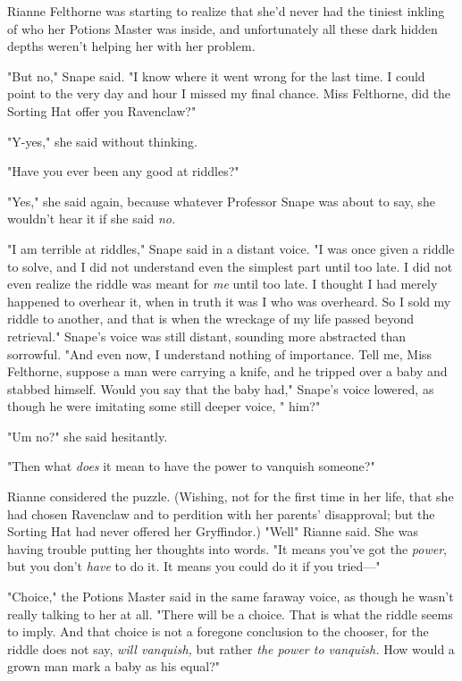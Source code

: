 Rianne Felthorne was starting to realize that she'd never had the tiniest
inkling of who her Potions Master was inside, and unfortunately all these dark
hidden depths weren't helping her with her problem.

"But no," Snape said. "I know where it went wrong for the last time. I could
point to the very day and hour I missed my final chance. Miss Felthorne, did
the Sorting Hat offer you Ravenclaw?"

"Y-yes," she said without thinking.

"Have you ever been any good at riddles?"

"Yes," she said again, because whatever Professor Snape was about to say, she
wouldn't hear it if she said \emph{no.}

"I am terrible at riddles," Snape said in a distant voice. "I was once given a
riddle to solve, and I did not understand even the simplest part until too
late. I did not even realize the riddle was meant for \emph{me} until too late.
I thought I had merely happened to overhear it, when in truth it was I who was
overheard. So I sold my riddle to another, and that is when the wreckage of my
life passed beyond retrieval." Snape's voice was still distant, sounding more
abstracted than sorrowful. "And even now, I understand nothing of importance.
Tell me, Miss Felthorne, suppose a man were carrying a knife, and he tripped
over a baby and stabbed himself. Would you say that the baby had," Snape's
voice lowered, as though he were imitating some still deeper voice, " him?"

"Um{\el} no?" she said hesitantly.

"Then what \emph{does} it mean to have the power to vanquish someone?"

Rianne considered the puzzle. (Wishing, not for the first time in her life,
that she had chosen Ravenclaw and to perdition with her parents' disapproval;
but the Sorting Hat had never offered her Gryffindor.) "Well{\el}" Rianne
said. She was having trouble putting her thoughts into words. "It means you've
got the \emph{power}, but you don't \emph{have} to do it. It means you could do
it if you tried\mbox{---}"

"Choice," the Potions Master said in the same faraway voice, as though he
wasn't really talking to her at all. "There will be a choice. That is what the
riddle seems to imply. And that choice is not a foregone conclusion to the
chooser, for the riddle does not say, \emph{will vanquish,} but rather
\emph{the power to vanquish.} How would a grown man mark a baby as his equal?"

